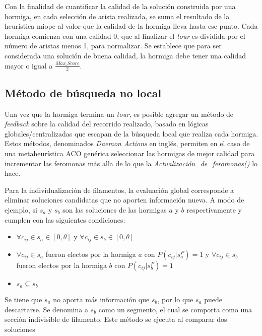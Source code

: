 Con la finalidad de cuantificar la calidad de la soluci\'on construida por una hormiga, en cada selecci\'on de arista realizada, se suma el resultado de la heur\'istica miope al valor que la calidad de la hormiga lleva hasta ese punto. Cada hormiga comienza con una calidad 0, que al finalizar el {\it tour} es dividida por el n\'umero de aristas menos 1, para normalizar. Se establece que para ser considerada una soluci\'on de buena calidad, la hormiga debe tener una calidad mayor o igual a $\frac{Max\_Score}{2}$.
    
\subsection{M\'etodo de b\'usqueda no local}
Una vez que la hormiga termina un {\it tour}, es posible agregar un m\'etodo de {\it feedback} sobre la calidad del recorrido realizado, basado en l\'ogicas globales/centralizadas que escapan de la b\'usqueda local que realiza cada hormiga. Estos m\'etodos, denominados {\it Daemon Actions} en ingl\'es, permiten en el caso de una metaheur\'istica ACO gen\'erica seleccionar las hormigas de mejor calidad para incrementar las feromonas m\'as alla de lo que la {\it Actualizaci\'on\_de\_feromonas()} lo hace. 

Para la individualizaci\'on de filamentos, la evaluaci\'on global corresponde a eliminar soluciones candidatas que no aporten informaci\'on nueva. A modo de ejemplo, si $s_a$ y $s_b$ son las soluciones de las hormigas $a$ y $b$ respectivamente y cumplen con las siguientes condiciones:

\begin{itemize}
    \item $\forall c_{ij} \in s_a \in [0, \theta]$ y $\forall c_{ij} \in s_b \in [0, \theta]$
    \item $\forall c_{ij} \in s_a$ fueron electos por la hormiga $a$ con $P(c_{ij} | s_{a}^{P}) = 1$ y $\forall c_{ij} \in s_b$ fueron electos por la hormiga $b$ con $P(c_{ij} | s_{b}^{P}) = 1$
    \item $s_a \subseteq s_b$
\end{itemize}

Se tiene que $s_a$ no aporta m\'as informaci\'on que $s_b$, por lo que $s_a$ puede descartarse. Se denomina a $s_b$ como un segmento, el cual se comporta como una secci\'on indivisible de filamento. Este m\'etodo se ejecuta al comparar dos soluciones 

    
